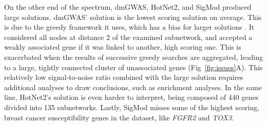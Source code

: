 \documentclass[10pt,letterpaper]{article}
\begin{document}
On the other end of the spectrum, dmGWAS, HotNet2, and SigMod produced large solutions. dmGWAS' solution is the lowest scoring solution on average. This is due to the greedy framework it uses, which has a bias for larger solutions \cite{nikolayeva_network_2018}. It considered all nodes at distance 2 of the examined subnetwork, and accepted a weakly associated gene if it was linked to another, high scoring one. This is exacerbated when the results of successive greedy searches are aggregated, leading to a large, tightly connected cluster of unassociated genes (Fig~\ref{fig:issues}A). This relatively low signal-to-noise ratio combined with the large solution requires additional analyses to draw conclusions, such as enrichment analyses. In the same line, HotNet2's solution is even harder to interpret, being composed of 440 genes divided into 135 subnetworks. Lastly, SigMod misses some of the highest scoring, breast cancer susceptibility genes in the dataset, like \emph{FGFR2} and \emph{TOX3}.
\end{document}
